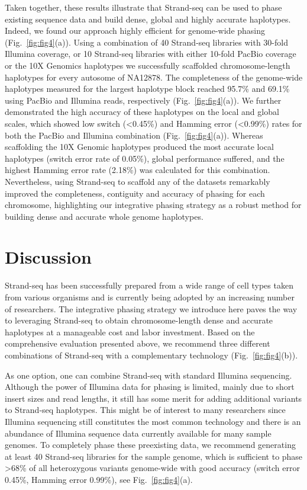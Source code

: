     Taken together, these results illustrate that Strand-seq can be used to phase existing sequence data and build dense, global and highly accurate haplotypes. 
    Indeed, we found our approach highly efficient for genome-wide phasing (Fig.~\ref{fig:fig4}(a)). Using a combination of 40 Strand-seq libraries with 30-fold Illumina coverage, 
    or 10 Strand-seq libraries with either 10-fold PacBio coverage or the 10X Genomics haplotypes we successfully scaffolded chromosome-length haplotypes for every autosome of NA12878. 
    The completeness of the genome-wide haplotypes measured for the largest haplotype block reached 95.7\% and 69.1\% using PacBio and Illumina reads, respectively (Fig.~\ref{fig:fig4}(a)). 
    We further demonstrated the high accuracy of these haplotypes on the local and global scales, which showed low switch (<0.45\%) and Hamming error (<0.99\%) rates for both the PacBio and Illumina combination (Fig.~\ref{fig:fig4}(a)). 
    Whereas scaffolding the 10X Genomic haplotypes produced the most accurate local haplotypes (switch error rate of 0.05\%), global performance suffered, and the highest Hamming error rate (2.18\%) was calculated for this combination. 
    Nevertheless, using Strand-seq to scaffold any of the datasets remarkably improved the completeness, contiguity and accuracy of phasing for each chromosome, 
    highlighting our integrative phasing strategy as a robust method for building dense and accurate whole genome haplotypes.
	




\section{Discussion}
	Strand-seq has been successfully prepared from a wide range of cell types taken from various organisms \citep{porubsky2016direct, falconer2012dna, sanders2017single} and is currently being adopted by an increasing number of researchers. 
	The integrative phasing strategy we introduce here paves the way to leveraging Strand-seq to obtain chromosome-length dense and accurate haplotypes at a manageable cost and labor investment. 
	Based on the comprehensive evaluation presented above, we recommend three different combinations of Strand-seq with a complementary technology (Fig.~\ref{fig:fig4}(b)).
	
	As one option, one can combine Strand-seq with standard Illumina sequencing. Although the power of Illumina data for phasing is limited, mainly due to short insert sizes and read lengths, it still has some merit for adding additional variants to Strand-seq haplotypes. 
	This might be of interest to many researchers since Illumina sequencing still constitutes the most common technology and there is an abundance of Illumina sequence data currently available for many sample genomes. 
	To completely phase these preexisting data, we recommend generating at least 40 Strand-seq libraries for the sample genome, which is sufficient to phase >68\% of all heterozygous variants genome-wide with good accuracy 
	(switch error 0.45\%, Hamming error 0.99\%), see Fig.~\ref{fig:fig4}(a).
	
